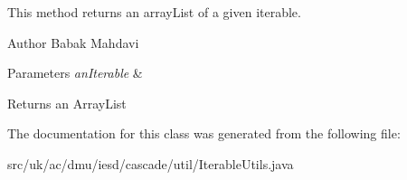 This method returns an array\-List of a given iterable. 

\begin{DoxyAuthor}{Author}
Babak Mahdavi 
\end{DoxyAuthor}

\begin{DoxyParams}{Parameters}
{\em an\-Iterable} & \\
\hline
\end{DoxyParams}
\begin{DoxyReturn}{Returns}
an Array\-List 
\end{DoxyReturn}


The documentation for this class was generated from the following file\-:\begin{DoxyCompactItemize}
\item 
src/uk/ac/dmu/iesd/cascade/util/Iterable\-Utils.\-java\end{DoxyCompactItemize}
